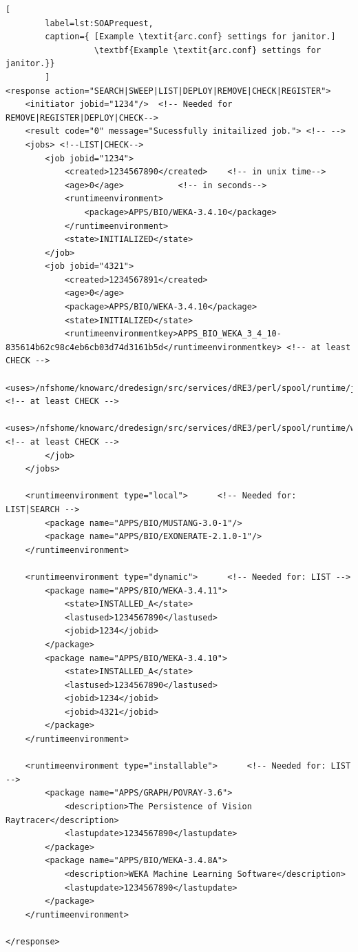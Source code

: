 \begin{lstlisting}[
        label=lst:SOAPrequest,
        caption={ [Example \textit{arc.conf} settings for janitor.]
                  \textbf{Example \textit{arc.conf} settings for janitor.}}
        ]
<response action="SEARCH|SWEEP|LIST|DEPLOY|REMOVE|CHECK|REGISTER">
	<initiator jobid="1234"/>  <!-- Needed for REMOVE|REGISTER|DEPLOY|CHECK-->
	<result code="0" message="Sucessfully initailized job."> <!-- -->
	<jobs> <!--LIST|CHECK-->
		<job jobid="1234">
			<created>1234567890</created>    <!-- in unix time-->
			<age>0</age>           <!-- in seconds-->
			<runtimeenvironment>
				<package>APPS/BIO/WEKA-3.4.10</package>
			</runtimeenvironment>
			<state>INITIALIZED</state>
		</job>
		<job jobid="4321">
			<created>1234567891</created>
			<age>0</age>
			<package>APPS/BIO/WEKA-3.4.10</package>
			<state>INITIALIZED</state>
			<runtimeenvironmentkey>APPS_BIO_WEKA_3_4_10-835614b62c98c4eb6cb03d74d3161b5d</runtimeenvironmentkey> <!-- at least CHECK -->
			<uses>/nfshome/knowarc/dredesign/src/services/dRE3/perl/spool/runtime/jre__57T1ke1UVz/runtime</uses> <!-- at least CHECK -->
			<uses>/nfshome/knowarc/dredesign/src/services/dRE3/perl/spool/runtime/weka_wHfyytarlE/runtime</uses> <!-- at least CHECK -->
		</job>
	</jobs>

	<runtimeenvironment type="local">      <!-- Needed for: LIST|SEARCH -->
		<package name="APPS/BIO/MUSTANG-3.0-1"/>
		<package name="APPS/BIO/EXONERATE-2.1.0-1"/>
	</runtimeenvironment>

	<runtimeenvironment type="dynamic">      <!-- Needed for: LIST -->
		<package name="APPS/BIO/WEKA-3.4.11">
			<state>INSTALLED_A</state>
			<lastused>1234567890</lastused>
			<jobid>1234</jobid>
		</package>
		<package name="APPS/BIO/WEKA-3.4.10">
			<state>INSTALLED_A</state>
			<lastused>1234567890</lastused>
			<jobid>1234</jobid>
			<jobid>4321</jobid>
		</package>
	</runtimeenvironment>

	<runtimeenvironment type="installable">      <!-- Needed for: LIST -->
		<package name="APPS/GRAPH/POVRAY-3.6">
			<description>The Persistence of Vision Raytracer</description>
			<lastupdate>1234567890</lastupdate>
		</package>
		<package name="APPS/BIO/WEKA-3.4.8A">
			<description>WEKA Machine Learning Software</description>
			<lastupdate>1234567890</lastupdate>
		</package>
	</runtimeenvironment>

</response>
\end{lstlisting}




